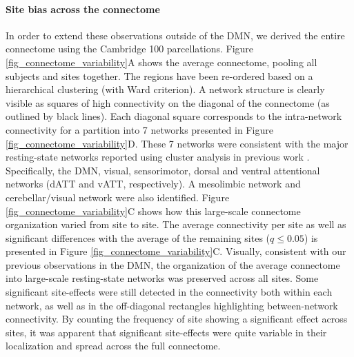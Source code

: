 \documentclass[authoryear]{elsarticle}
\begin{document}
\paragraph{Site bias across the connectome} In order to extend these observations outside of the DMN, we derived the entire connectome using the Cambridge 100 parcellations. Figure \ref{fig_connectome_variability}A shows the average connectome, pooling all subjects and sites together. The regions have been re-ordered based on a hierarchical clustering (with Ward criterion). A network structure is clearly visible as squares of high connectivity on the diagonal of the connectome (as outlined by black lines). Each diagonal square corresponds to the intra-network connectivity for a partition into 7 networks presented in Figure \ref{fig_connectome_variability}D. These 7 networks were consistent with the major resting-state networks reported using cluster analysis in previous work \citep[e.g.][]{Heuvel2008, Bellec2010, Yeo2011, Power2011}. Specifically, the DMN, visual, sensorimotor, dorsal and ventral attentional networks (dATT and vATT, respectively). A mesolimbic network and cerebellar/visual network were also identified. Figure \ref{fig_connectome_variability}C shows how this large-scale connectome organization varied from site to site. The average connectivity per site as well as significant differences with the average of the remaining sites ($q\leq 0.05$) is presented in Figure \ref{fig_connectome_variability}C. Visually, consistent with our previous observations in the DMN, the organization of the average connectome into large-scale resting-state networks was preserved across all sites. Some significant site-effects were still detected in the connectivity both within each network, as well as in the off-diagonal rectangles highlighting between-network connectivity. By counting the frequency of site showing a significant effect across sites, it was apparent that significant site-effects were quite variable in their localization and spread across the full connectome. 
\end{document}
